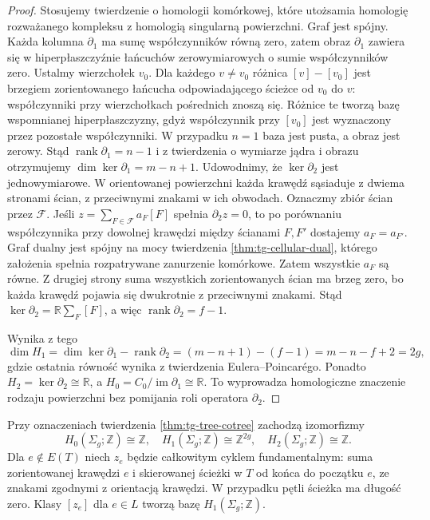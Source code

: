 \begin{proof}
Stosujemy twierdzenie o homologii komórkowej, które
utożsamia homologię rozważanego kompleksu z homologią
singularną powierzchni. Graf jest spójny. Każda kolumna
$\partial_1$ ma sumę współczynników równą zero, zatem
obraz $\partial_1$ zawiera się w hiperpłaszczyźnie
łańcuchów zerowymiarowych o sumie współczynników zero.
Ustalmy wierzchołek $v_0$. Dla każdego $v\ne v_0$
różnica $[v]-[v_0]$ jest brzegiem zorientowanego
łańcucha odpowiadającego ścieżce od $v_0$ do $v$:
współczynniki przy wierzchołkach pośrednich znoszą się.
Różnice te tworzą bazę wspomnianej hiperpłaszczyzny,
gdyż współczynnik przy $[v_0]$ jest wyznaczony przez
pozostałe współczynniki. W przypadku $n=1$ baza jest
pusta, a obraz jest zerowy. Stąd
$\operatorname{rank}\partial_1=n-1$ i z twierdzenia
o wymiarze jądra i obrazu otrzymujemy
$\dim\ker\partial_1=m-n+1$. Udowodnimy, że
$\ker\partial_2$ jest jednowymiarowe. W orientowanej
powierzchni każda krawędź sąsiaduje z dwiema stronami
ścian, z przeciwnymi znakami w ich obwodach. Oznaczmy zbiór ścian przez $\mathcal F$. Jeśli
$z=\sum_{F\in\mathcal F}a_F[F]$ spełnia
$\partial_2z=0$, to po porównaniu współczynnika
przy dowolnej krawędzi między ścianami $F,F'$ dostajemy
$a_F=a_{F'}$. Graf dualny jest spójny na mocy twierdzenia
\ref{thm:tg-cellular-dual}, którego założenia spełnia
rozpatrywane zanurzenie komórkowe.
Zatem wszystkie $a_F$ są równe. Z drugiej strony
suma wszystkich zorientowanych ścian ma brzeg zero,
bo każda krawędź pojawia się dwukrotnie z przeciwnymi
znakami. Stąd
$\ker\partial_2=\mathbb R\sum_F[F]$, a więc
$\operatorname{rank}\partial_2=f-1$.

Wynika z tego
\[
\dim H_1=\dim\ker\partial_1-\operatorname{rank}\partial_2
=(m-n+1)-(f-1)=m-n-f+2=2g,
\]
gdzie ostatnia równość wynika z twierdzenia Eulera--Poincarégo.
Ponadto $H_2=\ker\partial_2\cong\mathbb R$,
a $H_0=C_0/\operatorname{im}\partial_1\cong\mathbb R$.
To wyprowadza homologiczne znaczenie rodzaju powierzchni
bez pomijania roli operatora $\partial_2$.
\end{proof}

\begin{twierdzenie}
\label{thm:tg-surface-integral}
Przy oznaczeniach twierdzenia \ref{thm:tg-tree-cotree}
zachodzą izomorfizmy
\[
H_0(\Sigma_g;\mathbb Z)\cong\mathbb Z,\quad
H_1(\Sigma_g;\mathbb Z)\cong\mathbb Z^{2g},\quad
H_2(\Sigma_g;\mathbb Z)\cong\mathbb Z.
\]
Dla $e\notin E(T)$ niech $z_e$ będzie całkowitym
cyklem fundamentalnym: suma zorientowanej krawędzi
$e$ i skierowanej ścieżki w $T$ od końca do początku
$e$, ze znakami zgodnymi z orientacją krawędzi.
W przypadku pętli ścieżka ma długość zero.
Klasy $[z_e]$ dla $e\in L$ tworzą bazę
$H_1(\Sigma_g;\mathbb Z)$.
\end{twierdzenie}

